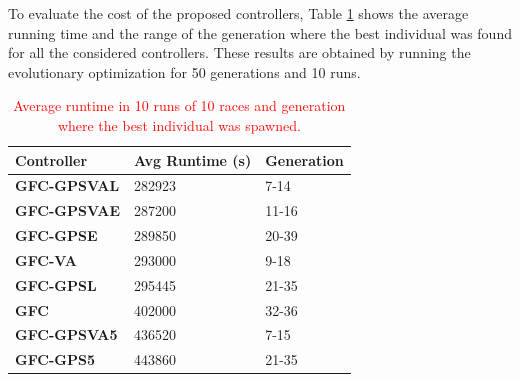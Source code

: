 \documentclass[10pt,journal,compsoc]{IEEEtran}
\begin{document}
To evaluate the cost of the proposed controllers, Table \ref{tab:time} shows the average running time and the range of the generation where the best individual was found for all the considered controllers. These results are obtained by running the evolutionary optimization for 50 generations and 10 runs.  

\begin{table}[!ht]
	\centering
	{\scriptsize
          \caption{\textcolor{red}{Average runtime in 10 runs of 10 races 
            and
                  generation where the best individual was spawned.}}
		\label{tab:time}
		\begin{tabular}{|p{2.85cm}|p{2.20cm}|p{1.65cm}|}
			\hline  
			Controller& \textbf{Avg Runtime (s)}&\textbf{Generation}\\
\hline
\hline 	 
 \textbf{{\sf GFC-GPSVAL}} \cite{DBLP:conf/cig/SalemMG19}& \cellcolor{red!25}282923
&\cellcolor{red!25}7-14\\	
\textbf{{\sf GFC-GPSVAE}}& \cellcolor{red!25}287200
&\cellcolor{red!25}11-16\\
 \textbf{{\sf GFC-GPSE}}&\cellcolor{red!25}	289850
&\cellcolor{red!25}20-39\\
\textbf{{\sf GFC-VA}} \cite{DBLP:conf/cig/SalemMG19}&\cellcolor{red!25}293000
&\cellcolor{red!25}9-18\\
 \textbf{{\sf GFC-GPSL}} \cite{DBLP:conf/cig/SalemMG19}& \cellcolor{red!25}295445
&\cellcolor{red!25}21-35\\
\textbf{\textbf{{\sf GFC}}} \cite{salem_cig2018}&\cellcolor{red!25}402000
                   &\cellcolor{red!25}32-36\\
\textbf{{\sf GFC-GPSVA5}} \cite{DBLP:conf/cig/SalemMG19}&\cellcolor{red!25}	436520
&\cellcolor{red!25}7-15\\	
	
 \textbf{{\sf GFC-GPS5}} \cite{DBLP:conf/cig/SalemMG19}&\cellcolor{red!25}443860
				&\cellcolor{red!25}21-35\\	
					
			\hline 
		
		\end{tabular}
		
	}
\end{table} 
\end{document}
